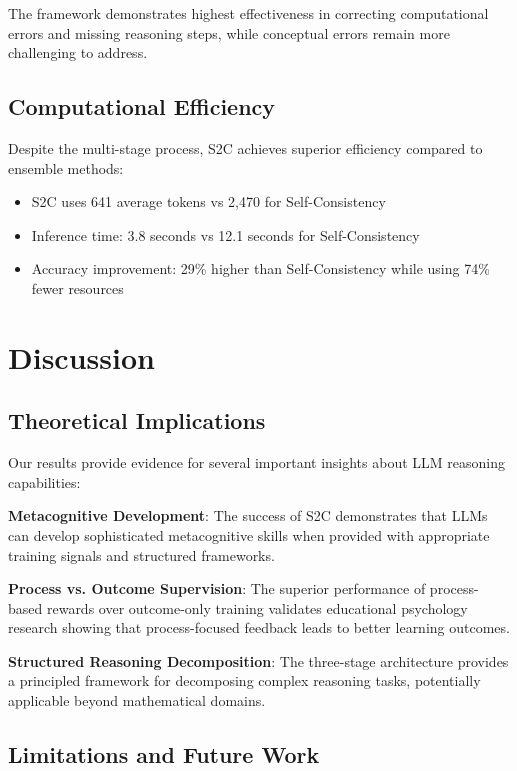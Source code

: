 \documentclass[10pt,twocolumn]{article}
\newcommand{\ssc}{\textsc{S2C}}
\begin{document}
The framework demonstrates highest effectiveness in correcting computational errors and missing reasoning steps, while conceptual errors remain more challenging to address.

\subsection{Computational Efficiency}

Despite the multi-stage process, \ssc{} achieves superior efficiency compared to ensemble methods:

\begin{itemize}
\item \ssc{} uses 641 average tokens vs 2,470 for Self-Consistency
\item Inference time: 3.8 seconds vs 12.1 seconds for Self-Consistency
\item Accuracy improvement: 29\% higher than Self-Consistency while using 74\% fewer resources
\end{itemize}

\section{Discussion}

\subsection{Theoretical Implications}

Our results provide evidence for several important insights about LLM reasoning capabilities:

\textbf{Metacognitive Development}: The success of \ssc{} demonstrates that LLMs can develop sophisticated metacognitive skills when provided with appropriate training signals and structured frameworks.

\textbf{Process vs. Outcome Supervision}: The superior performance of process-based rewards over outcome-only training validates educational psychology research showing that process-focused feedback leads to better learning outcomes.

\textbf{Structured Reasoning Decomposition}: The three-stage architecture provides a principled framework for decomposing complex reasoning tasks, potentially applicable beyond mathematical domains.

\subsection{Limitations and Future Work}
\end{document}
